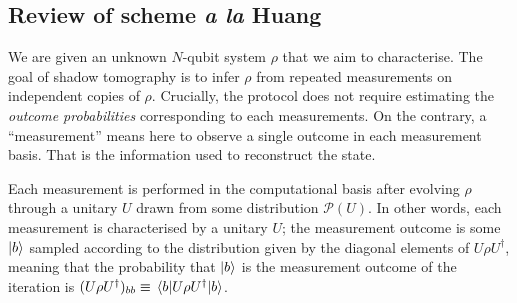 \documentclass[12pt]{report}
\newcommand{\calP}{{\mathcal{P}}}
\begin{document}

\subsection{Review of scheme \textit{a la} Huang}
We are given an unknown $N$-qubit system $\rho$ that we aim to characterise. The goal of shadow tomography is to infer $\rho$ from repeated measurements on independent copies of $\rho$.
Crucially, the protocol does not require estimating the \textit{outcome probabilities} corresponding to each measurements. On the contrary, a ``measurement'' means here to observe a single outcome in each measurement basis. That is the information used to reconstruct the state.

Each measurement is performed in the computational basis after evolving $\rho$ through a unitary $U$ drawn from some distribution $\calP(U)$.
In other words, each measurement is characterised by a unitary $U$; the measurement outcome is some $\ket b$ sampled according to the distribution given by the diagonal elements of $U\rho U^\dagger$, meaning that the probability that $\ket b$ is the measurement outcome of the iteration is $(U\rho U^\dagger)_{bb}\equiv \mel{b}{U\rho U^\dagger}{b}$.
\end{document}
